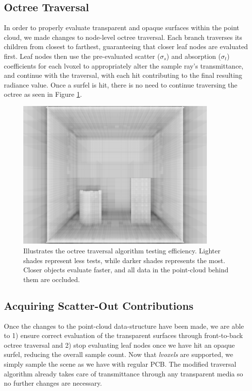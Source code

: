 \documentclass[12pt]{ucthesis}
\begin{document}
\subsection{Octree Traversal}

In order to properly evaluate transparent and opaque surfaces within the point cloud, we made changes to node-level octree traversal.  Each branch traverses its children from closest to farthest, guaranteeing that closer leaf nodes are evaluated first.  Leaf nodes then use the pre-evaluated scatter ($\sigma_{s}$) and absorption ($\sigma_{t}$) coefficients for each lvoxel to appropriately alter the sample ray's transmittance, and continue with the traversal, with each hit contributing to the final resulting radiance value.  Once a surfel is hit, there is no need to continue traversing the octree as seen in Figure \ref{fig:testing}.

\begin{figure}[h!]
    \centering
    \includegraphics[width=100mm]{img/testing.png}
    \caption{Illustrates the octree traversal algorithm testing efficiency.  Lighter shades represent less tests, while darker shades represents the most.  Closer objects evaluate faster, and all data in the point-cloud behind them are occluded.}
    \label{fig:testing}
\end{figure}

\subsection{Acquiring Scatter-Out Contributions}
\label{scatterout_sec}

Once the changes to the point-cloud data-structure have been made, we are able to 1) ensure correct evaluation of the transparent surfaces through front-to-back octree traversal and 2) stop evaluating leaf nodes once we have hit an opaque surfel, reducing the overall sample count.  Now that \textit{lvoxels} are supported, we simply sample the scene as we have with regular PCB.  The modified traversal algorithm already takes care of transmittance through any transparent media so no further changes are necessary.
\end{document}

